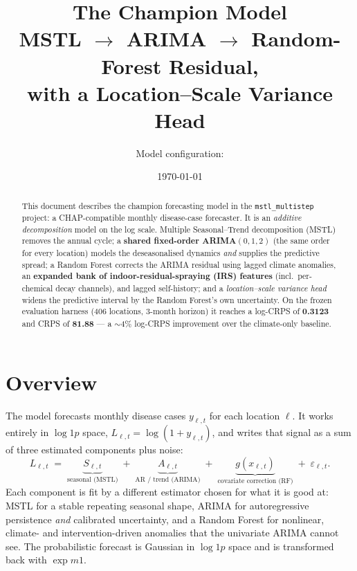 \documentclass[11pt]{article}
\title{\vspace{-1.5em}The \code{mstl\_multistep} Champion Model\\[0.3em]
\large MSTL $\rightarrow$ ARIMA $\rightarrow$ Random-Forest Residual,\\
with a Location--Scale Variance Head}
\author{Model configuration: \code{config\_arima012\_bank}}
\date{\today}
\newcommand{\code}[1]{\texttt{\small #1}}
\begin{document}
\maketitle
\vspace{-1.5em}

\begin{abstract}
\noindent
This document describes the champion forecasting model in the \code{mstl\_multistep}
project: a CHAP-compatible monthly disease-case forecaster. It is an \emph{additive
decomposition} model on the log scale. Multiple Seasonal--Trend decomposition (MSTL)
removes the annual cycle; a \textbf{shared fixed-order ARIMA$(0,1,2)$} (the same order for
every location) models the deseasonalised dynamics \emph{and} supplies the predictive
spread; a Random Forest corrects the ARIMA residual using lagged climate anomalies, an
\textbf{expanded bank of indoor-residual-spraying (IRS) features} (incl.\ per-chemical decay
channels), and lagged self-history; and a \emph{location--scale variance head} widens the
predictive interval by the Random Forest's own uncertainty. On the frozen evaluation harness
(406 locations, 3-month horizon) it reaches a log-CRPS of \textbf{0.3123} and CRPS of
\textbf{81.88} --- a $\sim$4\% log-CRPS improvement over the climate-only baseline.
\end{abstract}

\section{Overview}

The model forecasts monthly disease cases $y_{\ell,t}$ for each location $\ell$. It works
entirely in $\log 1p$ space, $L_{\ell,t}=\log(1+y_{\ell,t})$, and writes that signal as a
sum of three estimated components plus noise:
\begin{equation}
L_{\ell,t} \;=\; \underbrace{S_{\ell,t}}_{\text{seasonal (MSTL)}}
\;+\; \underbrace{A_{\ell,t}}_{\text{AR / trend (ARIMA)}}
\;+\; \underbrace{g(x_{\ell,t})}_{\text{covariate correction (RF)}}
\;+\; \varepsilon_{\ell,t}.
\label{eq:additive}
\end{equation}
Each component is fit by a different estimator chosen for what it is good at: MSTL for a
stable repeating seasonal shape, ARIMA for autoregressive persistence \emph{and} calibrated
uncertainty, and a Random Forest for nonlinear, climate- and intervention-driven anomalies
that the univariate ARIMA cannot see. The probabilistic forecast is Gaussian in $\log 1p$
space and is transformed back with $\exp m1$.
\end{document}
